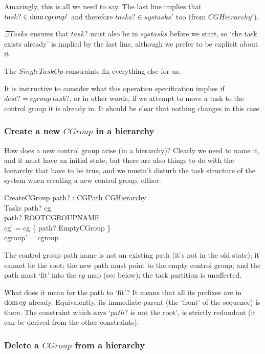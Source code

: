 \documentclass[a4paper,twoside,12pt]{article}
\begin{document}
Amazingly, this is all we need to say. The last line implies that $task? \in \mathop{\mathrm{dom}} cgroup'$ and therefore
$tasks? \in systasks'$ too (from $CGHierarchy'$).

$\Xi Tasks$ ensures that $task?$ must also be in $systasks$ before we start, so `the task exists already' is implied by the last line, although we prefer to be explicit about it.

The $SingleTaskOp$ constraints fix everything else for us.

It is instructive to consider what this operation specification implies if $dest? = cgroup ~ task?$, or in other words, if we
attempt to move a task to the control group it is already in. It should be clear that nothing changes in this case.

\subsubsection{Create a new $CGroup$ in a hierarchy}

How does a new control group arise (in a hierarchy)?
Clearly we need to name it, and it must have an initial state, but there are also things to do with the
hierarchy that have to be true, and we mustn't disturb the task structure of the system when
creating a new control group, either:

\begin{schema}{CreateCGroup}
path? : CGPath
\also
\Delta CGHierarchy \\
\Xi Tasks
\where
path? \notin \dom cg \\
path? \neq ROOTCGROUPNAME \\
cg' = cg \cup \{ path? \mapsto EmptyCGroup \} \\
cgroup' = cgroup
\end{schema}
The control group path name is not an existing path (it's not in the old state); it cannot be the root; the new path must point to the empty control group, and the path must `fit' into the $cg$ map (see below); the task partition is unaffected.

What does it mean for the path to `fit'? It means that all its prefixes are in $\mathop{\mathrm{dom}} cg$ already. Equivalently, its immediate parent (the `front' of the sequence) is there.
The constraint which says `$path?$ is not the root', is strictly redundant (it can be derived from the other constraints).

\subsubsection{Delete a $CGroup$ from a hierarchy}
\end{document}
